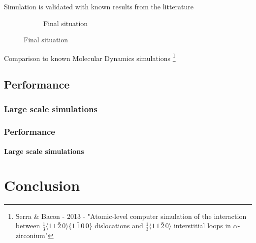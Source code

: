 \documentclass[aspectratio=1610,t,10pt]{beamer}
\newlength{\freeheight}
\begin{document}
\begin{frame}
\begin{block}{Simulation is validated with known results from the litterature}
\begin{figure}
\begin{subfigure}{0.49\textwidth}
			\caption{Final situation}
		\end{subfigure}
	\end{figure}
	\centering
	Comparison to known Molecular Dynamics simulations \footnote{\tiny Serra \& Bacon - 2013 - "Atomic-level computer simulation of the interaction between $\frac{1}{3}\langle 1\,1\,\bar{2}\,0 \rangle\{1\,\bar{1}\,0\,0\}$ dislocations and $\frac{1}{3}\langle 1\,1\,\bar{2}\,0 \rangle$ interstitial loops in  $\alpha$-zirconium"}
	\end{block}
\end{frame}

\subsection{Performance}

\subsubsection{Large scale simulations}

\begin{frame}
\frametitle{Performance}
\framesubtitle{Large scale simulations}
\centering
{}
\end{frame}


\section*{Conclusion}
\end{document}
